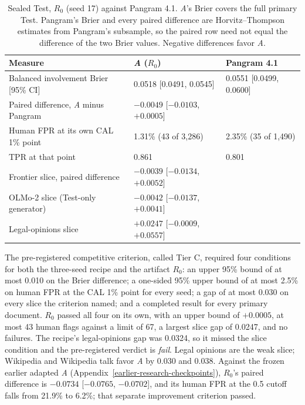 \begin{table}[H]
\centering
\begin{tabularx}{\linewidth}{@{}Lll@{}}
\toprule
Measure & \textit{A} (\(R_0\)) & Pangram 4.1 \\
\midrule
Balanced involvement Brier [95\% CI] & 0.0518 [0.0491, 0.0545] & 0.0551 [0.0499, 0.0600] \\
Paired difference, \textit{A} minus Pangram & \(-0.0049\) [\(-0.0103\), \(+0.0005\)] & \\
Human FPR at its own CAL 1\% point & 1.31\% (43 of 3,286) & 2.35\% (35 of 1,490) \\
TPR at that point & 0.861 & 0.801 \\
Frontier slice, paired difference & \(-0.0039\) [\(-0.0134\), \(+0.0052\)] & \\
OLMo-2 slice (Test-only generator) & \(-0.0042\) [\(-0.0137\), \(+0.0041\)] & \\
Legal-opinions slice & \(+0.0247\) [\(-0.0009\), \(+0.0557\)] & \\
\bottomrule
\end{tabularx}
\caption{Sealed Test, \(R_0\) (seed 17) against Pangram 4.1.
\textit{A}'s Brier covers the full primary Test. Pangram's Brier and every
paired difference are Horvitz--Thompson estimates from Pangram's subsample, so
the paired row need not equal the difference of the two Brier values.
Negative differences favor \textit{A}.}
\label{tab:tier-c}
\end{table}

The pre-registered competitive criterion, called Tier C, required four
conditions for both the three-seed recipe and the artifact \(R_0\): an upper
95\% bound of at most 0.010 on the Brier difference; a one-sided 95\% upper bound
of at most 2.5\% on human FPR at the CAL 1\% point for every seed; a gap of at most
0.030 on every slice the criterion named; and a completed result for every primary document.
\(R_0\) passed all four on its own, with an upper bound of
\(+0.0005\), at most 43 human flags against a limit of 67, a largest slice gap of
0.0247, and no failures. The recipe's legal-opinions gap was 0.0324, so it
missed the slice condition and the pre-registered verdict is \emph{fail}. Legal
opinions are the weak slice; Wikipedia and Wikipedia talk favor \textit{A} by
0.030 and 0.038. Against the frozen earlier adapted \textit{A}
(Appendix~\ref{earlier-research-checkpoints}),
\(R_0\)'s paired difference is \(-0.0734\) [\(-0.0765\), \(-0.0702\)],
and its human FPR at the 0.5 cutoff falls from 21.9\% to 6.2\%; that separate
improvement criterion passed.

